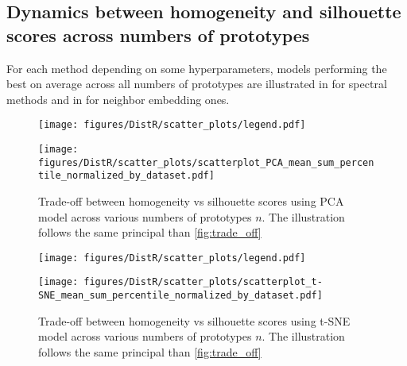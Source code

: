 \subsection{Dynamics between homogeneity and silhouette scores across numbers of prototypes}\label{sec:supp_hom_vs_sil}
For each method depending on some hyperparameters, models performing the best on average across all numbers of prototypes are illustrated in  for spectral methods and in  for neighbor embedding ones. 
	\begin{figure*}[h!]
		\begin{center}
			\centerline{\texttt{[image: figures/DistR/scatter\_plots/legend.pdf]}}\vspace{-1mm}
			\centerline{\texttt{[image: figures/DistR/scatter\_plots/scatterplot\_PCA\_mean\_sum\_percentile\_normalized\_by\_dataset.pdf]}
			}
			\caption{Trade-off between homogeneity vs silhouette scores using PCA model across various numbers of prototypes $n$. The illustration follows the same principal than \cref{fig:trade_off}}
			\label{fig:PCA_hom_vs_sil}
		\end{center}
	\end{figure*}
	\newpage
	\begin{figure*}[h!]
		\begin{center}
			\centerline{\texttt{[image: figures/DistR/scatter\_plots/legend.pdf]}}\vspace{-1mm}
			\centerline{\texttt{[image: figures/DistR/scatter\_plots/scatterplot\_t-SNE\_mean\_sum\_percentile\_normalized\_by\_dataset.pdf]}
			}
			\caption{Trade-off between homogeneity vs silhouette scores using t-SNE model across various numbers of prototypes $n$. The illustration follows the same principal than \cref{fig:trade_off}}
			\label{fig:SNE_hom_vs_sil}
		\end{center}
		\vspace{-0.8cm}
	\end{figure*}
	\newpage
